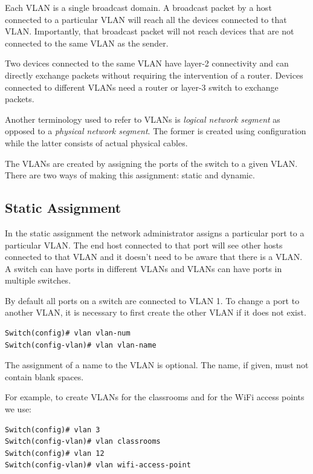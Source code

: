 Each VLAN is a single broadcast domain.
A broadcast packet by a host connected to a particular VLAN will reach all the devices connected to that VLAN.
Importantly, that broadcast packet will not reach devices that are not connected to the same VLAN as the sender.

Two devices connected to the same VLAN have layer-2 connectivity and can directly exchange packets without requiring the intervention of a router.
Devices connected to different VLANs need a router or layer-3 switch to exchange packets.

Another terminology used to refer to VLANs is \emph{logical network segment} as opposed to a \emph{physical network segment}.
The former is created using configuration while the latter consists of actual physical cables.

The VLANs are created by assigning the ports of the switch to a given VLAN. 
There are two ways of making this assignment: static and dynamic. 

\subsection{Static Assignment}

In the static assignment the network administrator assigns a particular port to a particular VLAN.
The end host connected to that port will see other hosts connected to that VLAN and it doesn't need to be aware that there is a VLAN.
A switch can have ports in different VLANs and VLANs can have ports in multiple switches.

By default all ports on a switch are connected to VLAN 1.
To change a port to another VLAN, it is necessary to first create the other VLAN if it does not exist.

\begin{lstlisting}
Switch(config)# vlan vlan-num
Switch(config-vlan)# vlan vlan-name
\end{lstlisting}

The assignment of a name to the VLAN is optional. 
The name, if given, must not contain blank spaces.

For example, to create VLANs for the classrooms and for the WiFi access points we use:

\begin{lstlisting}
Switch(config)# vlan 3
Switch(config-vlan)# vlan classrooms
Switch(config)# vlan 12
Switch(config-vlan)# vlan wifi-access-point
\end{lstlisting}

